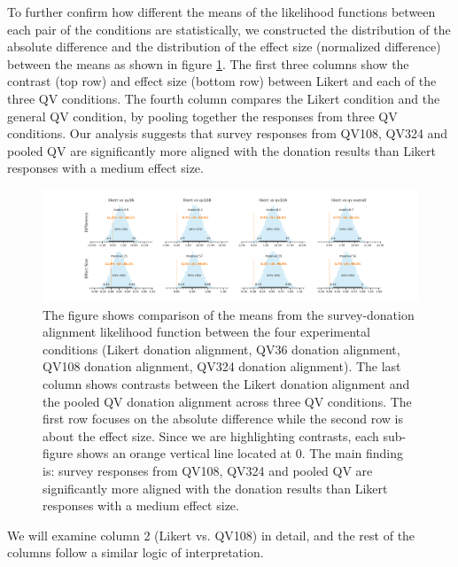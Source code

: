 To further confirm how different the means 
of the likelihood functions 
between each pair of the conditions are statistically, 
we constructed the distribution 
of the absolute difference and 
the distribution of the effect size 
(normalized difference) 
between the means as shown in figure \ref{fig:contrast_exp1}. The first three columns show the contrast (top row) and effect size (bottom row) between Likert and each of the three QV conditions. The fourth column compares the Likert condition and the general QV condition, by pooling together the responses from three QV conditions. Our analysis suggests that survey responses from QV108, QV324 and pooled QV are significantly more aligned with the donation results than Likert responses with a medium effect size. 

\begin{figure}[htpb]
  \centering
  \includegraphics[trim= 2in 0in 2in 0in, clip, width=\textwidth, keepaspectratio=true]{"content/image/Votes_vs_Absolute_Donation_StudentT_differences_and_effects.pdf"}
  \caption{
    The figure shows comparison of the means from the survey-donation alignment likelihood function between the four experimental conditions (Likert donation alignment, QV36 donation alignment, QV108 donation alignment, QV324 donation alignment). The last column shows contrasts between the Likert donation alignment and the pooled QV donation alignment across three QV conditions. The first row focuses on the absolute difference while the second row is about the effect size. Since we are highlighting contrasts, each sub-figure shows an orange vertical line located at 0. The main finding is: survey responses from QV108, QV324 and pooled QV are significantly more aligned with the donation results than Likert responses with a medium effect size.
  }
  \label{fig:contrast_exp1}
\end{figure}

We will examine column 2 (Likert vs. QV108) in detail, and the rest of the columns follow a similar logic of interpretation.

